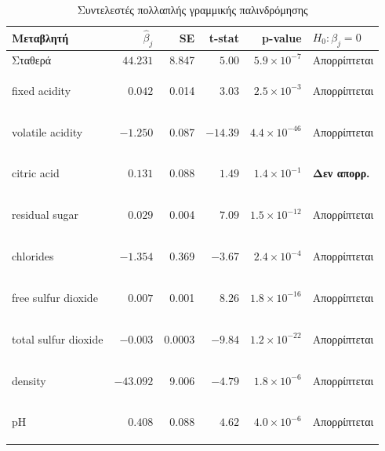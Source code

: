 \documentclass[12pt,a4paper]{article}
\begin{document}
\begin{table}[H]
\centering
\caption{Συντελεστές πολλαπλής γραμμικής παλινδρόμησης}
\label{tab:multiple_regression}
\small
\begin{tabular}{lrrrrl}
\toprule
\textbf{Μεταβλητή} & $\hat{\beta}_j$ & \textbf{SE} & \textbf{t-stat} & \textbf{p-value} & $H_0: \beta_j=0$ \\
\midrule
Σταθερά            &   $44.231$   & 8.847  &  $5.00$   & $5.9 \times 10^{-7}$  & Απορρίπτεται \\
\begin{english}fixed acidity\end{english}        &   $0.042$    & 0.014  &  $3.03$   & $2.5 \times 10^{-3}$  & Απορρίπτεται \\
\begin{english}volatile acidity\end{english}     &  $-1.250$    & 0.087  & $-14.39$  & $4.4 \times 10^{-46}$ & Απορρίπτεται \\
\begin{english}citric acid\end{english}          &   $0.131$    & 0.088  &  $1.49$   & $1.4 \times 10^{-1}$  & \textbf{Δεν απορρ.} \\
\begin{english}residual sugar\end{english}       &   $0.029$    & 0.004  &  $7.09$   & $1.5 \times 10^{-12}$ & Απορρίπτεται \\
\begin{english}chlorides\end{english}            &  $-1.354$    & 0.369  & $-3.67$   & $2.4 \times 10^{-4}$  & Απορρίπτεται \\
\begin{english}free sulfur dioxide\end{english}  &   $0.007$    & 0.001  &  $8.26$   & $1.8 \times 10^{-16}$ & Απορρίπτεται \\
\begin{english}total sulfur dioxide\end{english} &  $-0.003$    & 0.0003 & $-9.84$   & $1.2 \times 10^{-22}$ & Απορρίπτεται \\
\begin{english}density\end{english}              & $-43.092$    & 9.006  & $-4.79$   & $1.8 \times 10^{-6}$  & Απορρίπτεται \\
\begin{english}pH\end{english}                   &   $0.408$    & 0.088  &  $4.62$   & $4.0 \times 10^{-6}$  & Απορρίπτεται \\

\end{tabular}
\end{table}
\end{document}
